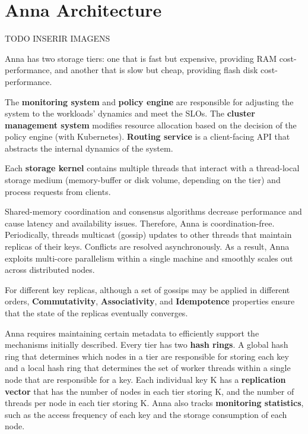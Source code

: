 \documentclass[14pt,oneside]{extreport}
\newcommand*\fpar{\hspace{1ex}}
\begin{document}
  \section{Anna Architecture}
  \fpar TODO INSERIR IMAGENS
  \par Anna has two storage tiers: one that is fast but expensive, providing RAM cost-performance, and another that is slow but cheap, providing flash disk cost-performance.
  \par The \textbf{monitoring system} and \textbf{policy engine} are responsible for adjusting the system to the workloads’ dynamics and meet the SLOs. The \textbf{cluster management system} modifies resource allocation based on the decision of the policy engine (with Kubernetes). \textbf{Routing service} is a client-facing API that abstracts the internal dynamics of the system.
  \par Each \textbf{storage kernel} contains multiple threads that interact with a thread-local storage medium (memory-buffer or disk volume, depending on the tier) and process requests from clients.
  \par Shared-memory coordination and consensus algorithms decrease performance and cause latency and availability issues. Therefore, Anna is coordination-free. Periodically, threads multicast (gossip) updates to other threads that maintain replicas of their keys. Conflicts are resolved asynchronously. As a result, Anna exploits multi-core parallelism within a single machine and smoothly scales out across distributed nodes.
  \par For different key replicas, although a set of gossips may be applied in different orders, \textbf{Commutativity}, \textbf{Associativity}, and \textbf{Idempotence} properties ensure that the state of the replicas eventually converges.
  \par Anna requires maintaining certain metadata to efficiently support the mechanisms initially described. Every tier has two \textbf{hash rings}. A global hash ring that determines which nodes in a tier are responsible for storing each key and a local hash ring that determines the set of worker threads within a single node that are responsible for a key. Each individual key K has a \textbf{replication vector} that has the number of nodes in each tier storing K, and the number of threads per node in each tier storing K. Anna also tracks \textbf{monitoring statistics}, such as the access frequency of each key and the storage consumption of each node.
\end{document}
